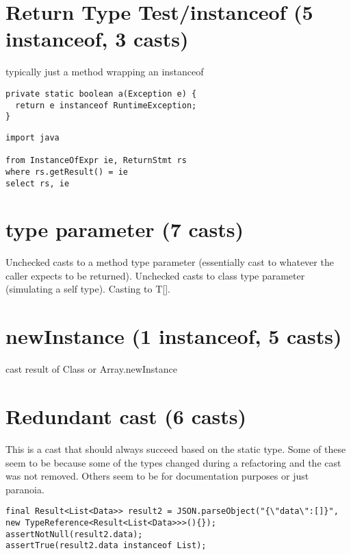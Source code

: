 \documentclass{usiinfdocprop}
\begin{document}
\section{Return Type Test/instanceof (5 instanceof, 3 casts)}
\label{sec:org5ec6c76}

typically just a method wrapping an instanceof 

\lstset{language=java,label= ,caption= ,captionpos=b,numbers=none}
\begin{lstlisting}
private static boolean a(Exception e) {
  return e instanceof RuntimeException;
}
\end{lstlisting}

\lstset{language=ql,label= ,caption= ,captionpos=b,numbers=none}
\begin{lstlisting}
import java

from InstanceOfExpr ie, ReturnStmt rs
where rs.getResult() = ie
select rs, ie
\end{lstlisting}

\section{type parameter (7 casts)}
\label{sec:org13d3cad}
Unchecked casts to a method type parameter (essentially cast to whatever the caller expects to be returned). Unchecked casts to class type parameter (simulating a self type). Casting to T[]. 

\section{newInstance (1 instanceof, 5 casts)}
\label{sec:orgd045c1f}
cast result of Class or Array.newInstance 

\section{Redundant cast (6 casts)}
\label{sec:orge4a97eb}

This is a cast that should always succeed based on the static type. 
Some of these seem to be because some of the types changed during a refactoring and the cast was not removed.
Others seem to be for documentation purposes or just paranoia. 

\lstset{language=java,label= ,caption= ,captionpos=b,numbers=none}
\begin{lstlisting}
final Result<List<Data>> result2 = JSON.parseObject("{\"data\":[]}", new TypeReference<Result<List<Data>>>(){});
assertNotNull(result2.data);
assertTrue(result2.data instanceof List);
\end{lstlisting}
\end{document}
